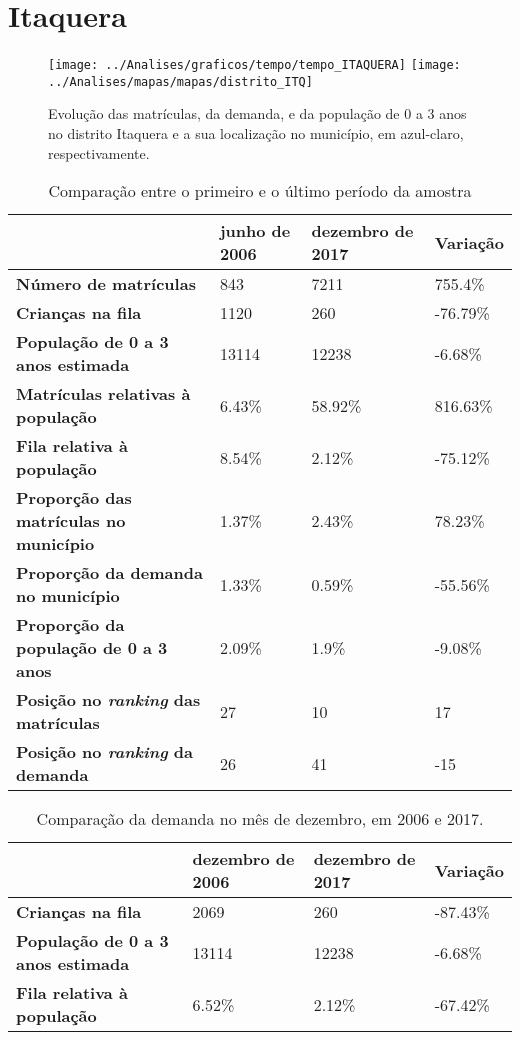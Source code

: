 \section{Itaquera}
\begin{figure}[H]
\centering
\texttt{[image: ../Analises/graficos/tempo/tempo\_ITAQUERA]}
\texttt{[image: ../Analises/mapas/mapas/distrito\_ITQ]}
\caption{Evolução das matrículas, da demanda, e da população de 0 a 3 anos no distrito Itaquera e a sua localização no município, em azul-claro, respectivamente.}
\end{figure}
\begin{table}[H]
\begin{tabular}{l|l|l|l}
\textbf{}                                      & \textbf{junho de 2006}       & \textbf{dezembro de 2017}    & \textbf{Variação} \\ \hline
\textbf{Número de matrículas}                  & 843 & 7211 & 755.4\% \\ \hline
\textbf{Crianças na fila}                      & 1120 & 260 & -76.79\% \\ \hline
\textbf{População de 0 a 3 anos estimada}      & 13114 & 12238 & -6.68\% \\ \hline
\textbf{Matrículas relativas à população}      & 6.43\% & 58.92\% & 816.63\% \\ \hline
\textbf{Fila relativa à população}             & 8.54\% & 2.12\% & -75.12\% \\ \hline
\textbf{Proporção das matrículas no município} & 1.37\% & 2.43\% & 78.23\% \\ \hline
\textbf{Proporção da demanda no município}     & 1.33\% & 0.59\% & -55.56\% \\ \hline
\textbf{Proporção da população de 0 a 3 anos}  & 2.09\% & 1.9\% & -9.08\% \\ \hline
\textbf{Posição no \textit{ranking} das matrículas}     & 27 & 10 & 17 \\ \hline
\textbf{Posição no \textit{ranking} da demanda}         & 26 & 41 & -15 \\ 
\end{tabular}
\caption{Comparação entre o primeiro e o último período da amostra}
\end{table}
\begin{table}[H]
\begin{tabular}{l|l|l|l}
\textbf{}                                 & \textbf{dezembro de 2006} & \textbf{dezembro de 2017} & \textbf{Variação} \\ \hline
\textbf{Crianças na fila}                      & 2069 & 260 & -87.43\% \\ \hline
\textbf{População de 0 a 3 anos estimada}      & 13114 & 12238 & -6.68\% \\ \hline
\textbf{Fila relativa à população}             & 6.52\% & 2.12\% & -67.42\% \\
\end{tabular}
\caption{Comparação da demanda no mês de dezembro, em 2006 e 2017.}
\end{table}
